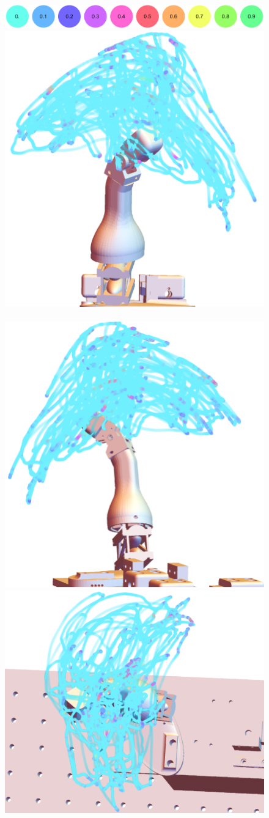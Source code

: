 \documentclass[letterpaper, 10 pt, conference]{ieeeconf}
\begin{document}
\begin{figure}
	\centering
	    \vspace{6pt}
	{\includegraphics[width = 1\columnwidth]{Figures/E20.PNG}\label{schem}}\\
	{\includegraphics[width = 0.8\columnwidth]{Figures/E21.PNG}\label{contract}}\\
	 \\
	{\includegraphics[width = 0.5\columnwidth]{Figures/E2.PNG}\label{overload}}{\includegraphics[width = 0.5\columnwidth]{Figures/E4.PNG}\label{overload}}\\

\end{figure}
\end{document}
